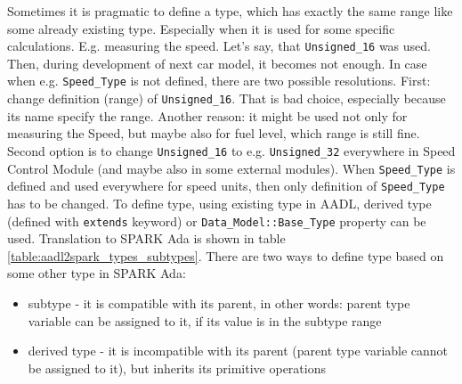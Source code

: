 Sometimes it is pragmatic to define a type, which has exactly the same range like some already existing type. Especially when it is used for some specific calculations. E.g. measuring the speed. Let's say, that \lstinline{Unsigned_16} was used. Then, during development of next car model, it becomes not enough. In case when e.g. \lstinline{Speed_Type} is not defined, there are two possible resolutions. First: change definition (range) of \lstinline{Unsigned_16}. That is bad choice, especially because its name specify the range. Another reason: it might be used not only for measuring the Speed, but maybe also for fuel level, which range is still fine. Second option is to change \lstinline{Unsigned_16} to e.g. \lstinline{Unsigned_32} everywhere in Speed Control Module (and maybe also in some external modules). When \lstinline{Speed_Type} is defined and used everywhere for speed units, then only definition of \lstinline{Speed_Type} has to be changed. To define type, using existing type in AADL, derived type (defined with \lstinline{extends} keyword) or \lstinline{Data_Model::Base_Type} property can be used. Translation to SPARK Ada is shown in table \ref{table:aadl2spark_types_subtypes}. There are two ways to define type based on some other type in SPARK Ada:

\begin{itemize}
	\item subtype - it is compatible with its parent, in other words: parent type variable can be assigned to it, if its value is in the subtype range
	\item derived type - it is incompatible with its parent (parent type variable cannot be assigned to it), but inherits its primitive operations
\end{itemize}

